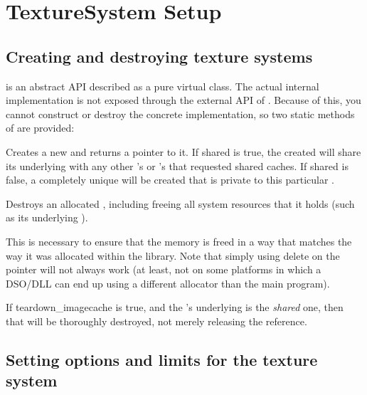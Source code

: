 \newpage
\section{TextureSystem Setup}
\label{sec:texturesys:api}

\subsection{Creating and destroying texture systems}
\label{sec:texturesys:api:createdestroy}

\TextureSystem is an abstract API described as a pure
virtual class.  The actual internal implementation is not exposed
through the external API of \product.  Because of this, you cannot
construct or destroy the concrete implementation, so two static
methods of \TextureSystem are provided:

Creates a new \TextureSystem and returns a pointer to it.
If {\cf shared} is {\cf true}, the \TextureSystem created will share its
underlying \ImageCache with any other \TextureSystem's or \ImageCache's
that requested shared caches.  If {\cf shared} is {\cf false}, a
completely unique \ImageCache will be created that is private to this
particular \TextureSystem.
\apiend

Destroys an allocated \TextureSystem, including freeing all system
resources that it holds (such as its underlying \ImageCache).

This is necessary to ensure that the memory is freed in a way that
matches the way it was allocated within the library.  Note that simply
using {\cf delete} on the pointer will not always work (at least,
not on some platforms in which a DSO/DLL can end up using a different
allocator than the main program).

If {\cf teardown_imagecache} is {\cf true}, and the \TextureSystem's
underlying \ImageCache is the \emph{shared} one, then that \ImageCache will
be thoroughly destroyed, not merely releasing the reference. \apiend

\subsection{Setting options and limits for the texture system}
\label{sec:texturesys:api:options}

